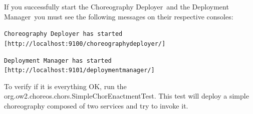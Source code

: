 \documentclass[a4paper, 10pt]{article}
\newcommand{\cd}{Choreography Deployer}
\newcommand{\dm}{Deployment Manager}
\begin{document}
If you successfully start the \cd\ and the \dm\, you must see the following messages on their respective consoles: 

\texttt{\cd\ has started [http://localhost:9100/choreographydeployer/]}

\texttt{\dm\ has started [http://localhost:9101/deploymentmanager/]}

To verify if it is everything OK, run the \textsf{org.ow2.choreos.chors.SimpleChorEnactmentTest}. This test will deploy a simple choreography composed of two services and try to invoke it.
\end{document}
